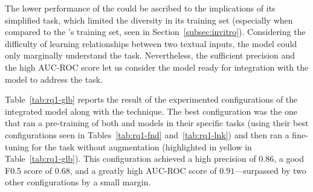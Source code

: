 The lower performance of the \linker could be ascribed to the implications of its simplified task, which limited the diversity in its training set (especially when compared to the \finder's training set, seen in Section~\ref{subsec:invitro}).
Considering the difficulty of learning relationships between two textual inputs, the \linker model could only marginally understand the task.
Nevertheless, the sufficient precision and the high AUC-ROC score let us consider the \linker model ready for integration with the \finder model to address the \matching task.


Table~\ref{tab:rq1-glb} reports the result of the \globalConfigs experimented configurations of the integrated model along with the \fixCommits technique.
%
The best configuration was the one that ran a pre-training of both \finder and \linker models in their specific tasks (using their best configurations seen in Tables~\ref{tab:rq1-fnd} and~\ref{tab:rq1-lnk}) and then ran a fine-tuning for the \matching task without augmentation (highlighted in yellow in Table~\ref{tab:rq1-glb}).
This configuration achieved a high precision of $0.86$, a good F0.5 score of $0.68$, and a greatly high AUC-ROC score of $0.91$---surpassed by two other configurations by a small margin.



